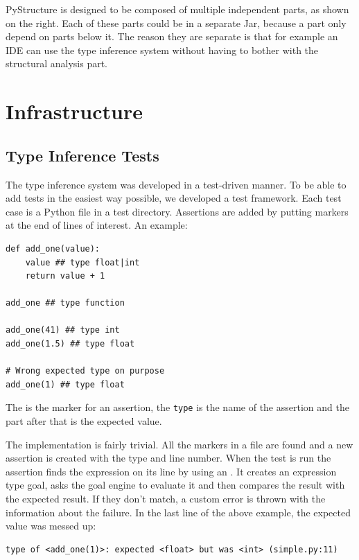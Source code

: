 \documentclass[12pt,halfparskip,DIV11,BCOR10mm]{scrreprt}
\begin{document}
PyStructure is designed to be composed of multiple independent parts, as shown on the right. Each of these parts could be in a separate Jar, because a part only depend on parts below it. The reason they are separate is that for example an IDE can use the type inference system without having to bother with the structural analysis part.


\section{Infrastructure}

\subsection{Type Inference Tests}

The type inference system was developed in a test-driven manner. To be able to add tests in the easiest way possible, we developed a test framework. Each test case is a Python file in a test directory. Assertions are added by putting markers at the end of lines of interest. An example:

\begin{lstlisting}
def add_one(value):
    value ## type float|int
    return value + 1

add_one ## type function

add_one(41) ## type int
add_one(1.5) ## type float

# Wrong expected type on purpose
add_one(1) ## type float
\end{lstlisting}

The \code{##} is the marker for an assertion, the \texttt{type} is the name of the assertion and the part after that is the expected value.

The implementation is fairly trivial. All the markers in a file are found and a new assertion is created with the type and line number. When the test is run the assertion finds the expression on its line by using an . It creates an expression type goal, asks the goal engine to evaluate it and then compares the result with the expected result. If they don't match, a custom error  is thrown with the information about the failure. In the last line of the above example, the expected value was messed up:

\begin{verbatim}
type of <add_one(1)>: expected <float> but was <int> (simple.py:11)
\end{verbatim}
\end{document}
